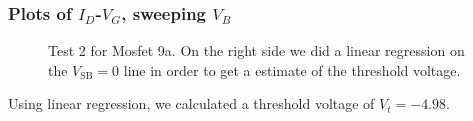 \documentclass{article}
\begin{document}
\subsubsection{Plots of $I_D$-$V_G$, sweeping $V_B$}

\begin{figure}[H]
\centering
{}
\caption{Test 2 for Mosfet 9a. On the right side we did a linear regression on the $V_{\text{SB}} = 0$ line in order to get a estimate of the threshold voltage.}
\label{fig:9alin}
\end{figure}

Using linear regression, we calculated a threshold voltage of $V_t = -4.98$.
\end{document}
